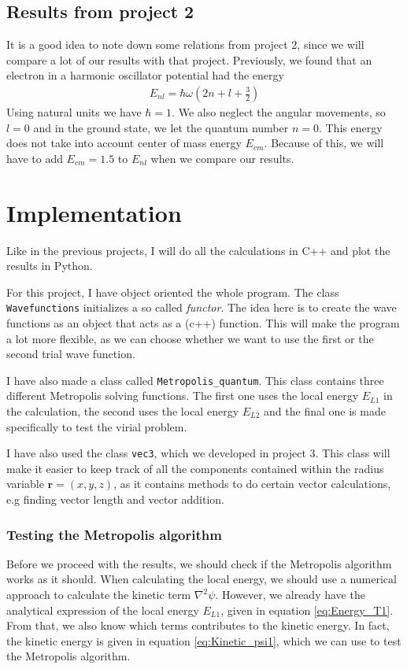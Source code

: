 \documentclass[12pt]{article}
\begin{document}
\subsection*{Results from project 2}
It is a good idea to note down some relations from project 2, since we will compare a lot of our results with that project. Previously, we found that an electron in a harmonic oscillator potential had the energy
\begin{align*}
E_{nl} = \hbar \omega \left(2n + l + \frac{3}{2} \right)
\end{align*}
Using natural units we have $\hbar = 1$. We also neglect the angular movements, so $l = 0$ and in the ground state, we let the quantum number $n=0$. This energy does not take into account center of mass energy $E_{cm}$. Because of this, we will have to add $E_{cm} = 1.5$ to $E_{nl}$ when we compare our results.
\section{Implementation} \label{section:implement}
Like in the previous projects, I will do all the calculations in C++ and plot the results in Python.

For this project, I have object oriented the whole program. The class\\ \texttt{Wavefunctions} initializes a so called \emph{functor}. The idea here is to create the wave functions as an object that acts as a (c++) function. This will make the program a lot more flexible, as we can choose whether we want to use the first or the second trial wave function.

I have also made a class called \texttt{Metropolis\_quantum}. This class contains three different Metropolis solving functions. The first one uses the local energy $E_{L1}$ in the calculation, the second uses the local energy $E_{L2}$ and the final one is made specifically to test the virial problem.

I have also used the class \texttt{vec3}, which we developed in project 3. This class will make it easier to keep track of all the components contained within the radius variable $\mathbf{r} = (x, y, z)$, as it contains methods to do certain vector calculations, e.g finding vector length and vector addition. 


\subsubsection*{Testing the Metropolis algorithm}
Before we proceed with the results, we should check if the Metropolis algorithm works as it should. When calculating the local energy, we should use a numerical approach to calculate the kinetic term $\nabla^2\psi$. However, we already have the analytical expression of the local energy $E_{L1}$, given in equation \ref{eq:Energy_T1}. From that, we also know which terms contributes to the kinetic energy. In fact, the kinetic energy is given in equation \ref{eq:Kinetic_psi1}, which we can use to test the Metropolis algorithm.
\end{document}
